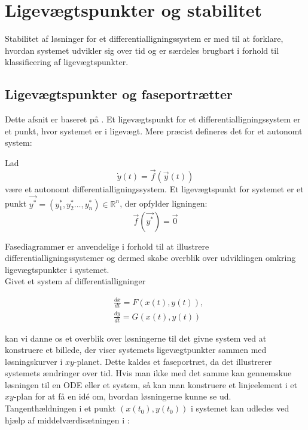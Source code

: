 \chapter{Ligevægtspunkter og stabilitet}
Stabilitet af løsninger for et differentialligningssystem er med til at forklare, hvordan systemet udvikler sig over tid og er særdeles brugbart i forhold til klassificering af ligevægtspunkter. 
\hfill \break

\section{Ligevægtspunkter og faseportrætter}
Dette afsnit er baseret på \citep[afsnit 7.2]{EP}. \hfill \break
Et ligevægtspunkt for et differentialligningssystem er et punkt, hvor systemet er i ligevægt. Mere præcist defineres det for et autonomt system:
\begin{definition}[Ligevægtspunkt]
Lad 
$$\dot{y}(t) = \vec{f}(\vec{y}(t))$$
være et autonomt differentialligningssystem.
Et ligevægtspunkt for systemet er et punkt $\vec{y^*}=(y_1^*,y_2^* \hdots ,y_n^*)\in \mathbb{R}^n$, der opfylder ligningen:
$$ \vec{f}(\vec{y^*})=\vec{0}$$
\end{definition}

Fasediagrammer er anvendelige i forhold til at illustrere differentialligningssystemer og dermed skabe overblik over udviklingen omkring ligevægtspunkter i systemet.\\

Givet et system af differentialligninger

\begin{equation}
    \begin{aligned}
    &\frac{dx}{dt}=F(x(t),y(t)),\\ 
    &\frac{dy}{dt}=G(x(t),y(t))
    \end{aligned}
\end{equation}

kan vi danne os et overblik over løsningerne til det givne system ved at konstruere et billede, der viser systemets ligevægtpunkter sammen med løsningskurver i $xy$-planet. Dette kaldes et faseportræt, da det illustrerer systemets ændringer over tid.
Hvis man ikke med det samme kan gennemskue løsningen til en ODE eller et system, så kan man konstruere et linjeelement i et $xy$-plan for at få en idé om, hvordan løsningerne kunne se ud. \\ \hfill \break
Tangenthældningen i et punkt $(x(t_0), y(t_0))$ i systemet kan udledes ved hjælp af middelværdisætningen i \citep[s. 118-119]{Analyse bog}:

